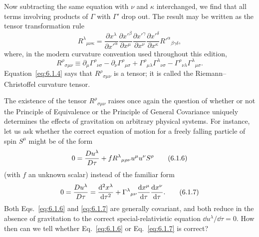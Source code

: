 Now subtracting the same equation with \(\nu\) and \(\kappa\) interchanged, we
find that all terms involving products of \(\Gamma\) with \(\Gamma'\) drop
out. The result may be written as the tensor transformation rule
\begin{equation}
  R^\lambda{}_{\mu\nu\kappa}
  =
  \frac{\partial x^\lambda}{\partial x'^\alpha}
  \frac{\partial x'^\beta}{\partial x^\mu}
  \frac{\partial x'^\gamma}{\partial x^\nu}
  \frac{\partial x'^\delta}{\partial x^\kappa}
  R'^\alpha{}_{\beta\gamma\delta},
  \tag{6.1.4}\label{eq:6.1.4}
\end{equation}
where, in the modern curvature convention used throughout this edition,
\begin{equation}
  R^\rho{}_{\sigma\mu\nu}
  \equiv
  \partial_\mu\Gamma^\rho{}_{\nu\sigma}
  -\partial_\nu\Gamma^\rho{}_{\mu\sigma}
  +\Gamma^\rho{}_{\mu\lambda}\Gamma^\lambda{}_{\nu\sigma}
  -\Gamma^\rho{}_{\nu\lambda}\Gamma^\lambda{}_{\mu\sigma}.
  \tag{6.1.5}\label{eq:6.1.5}
\end{equation}
Equation~\eqref{eq:6.1.4} says that
\(R^\rho{}_{\sigma\mu\nu}\) is a tensor; it is called the
Riemann--Christoffel curvature tensor.

The existence of the tensor \(R^\rho{}_{\sigma\mu\nu}\) raises once again the
question of whether or not the Principle of Equivalence or the Principle of
General Covariance uniquely determines the effects of gravitation on
arbitrary physical systems. For instance, let us ask whether the correct
equation of motion for a freely falling particle of spin \(S^\mu\) might be of
the form
\begin{equation}
  0
  =
  \frac{D u^\lambda}{D\tau}
  +f R^\lambda{}_{\mu\rho\nu}u^\mu u^\nu S^\rho
  \tag{6.1.6}\label{eq:6.1.6}
\end{equation}
(with \(f\) an unknown scalar) instead of the familiar form
\begin{equation}
  0
  =
  \frac{D u^\lambda}{D\tau}
  =
  \frac{\mathop{}\!\mathrm{d}^2x^\lambda}{\mathop{}\!\mathrm{d}\tau^2}
  +\Gamma^\lambda{}_{\mu\nu}
   \frac{\mathop{}\!\mathrm{d} x^\mu}{\mathop{}\!\mathrm{d}\tau}
   \frac{\mathop{}\!\mathrm{d} x^\nu}{\mathop{}\!\mathrm{d}\tau}.
  \tag{6.1.7}\label{eq:6.1.7}
\end{equation}
Both Eqs.~\eqref{eq:6.1.6} and \eqref{eq:6.1.7} are generally covariant, and
both reduce in the absence of gravitation to the correct
special-relativistic equation \(\dd u^\lambda/\dd\tau=0\). How then can we
tell whether Eq.~\eqref{eq:6.1.6} or Eq.~\eqref{eq:6.1.7} is correct?

